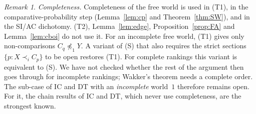 \documentclass[11pt]{article}
\theoremstyle{definition}\newtheorem{definition}[theorem]{Definition}
\theoremstyle{remark}\newtheorem{remark}[theorem]{Remark}
\begin{document}
\begin{remark}\label{rem:complete}
\emph{Completeness.} Completeness of the free world is used in (T1), in the
comparative-probability step (Lemma~\ref{lem:cp} and
Theorem~\ref{thm:SW}), and in the SI/AC dichotomy. (T2),
Lemma~\ref{lem:edge}, Proposition~\ref{prop:FA} and Lemma~\ref{lem:cboi} do
not use it. For an incomplete free world, (T1) gives only non-comparisons
$C_q\not\preceq_1Y$. A variant of (S) that also requires the strict sections
$\{p:X\prec_iC_p\}$ to be open restores (T1). For complete rankings this
variant is equivalent to (S). We have not checked whether the rest of the
argument then goes through for incomplete rankings; Wakker's theorem needs a
complete order. The sub-case of IC and DT with an \emph{incomplete} world~$1$
therefore remains open. For it, the chain results of IC and DT, which never
use completeness, are the strongest known.
\end{remark}
\end{document}
